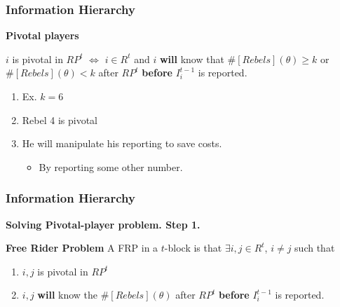 \documentclass[10pt]{beamer}
\begin{document}
\begin{frame}
  \frametitle{Information Hierarchy}

\textbf{Pivotal players}

\begin{definition}
$i$ is pivotal in $RP^t$ $\Leftrightarrow$ $i\in R^t$ and $i$ \textbf{will} know that $\#[Rebels](\theta)\geq k$ or $\#[Rebels](\theta)< k$ after $RP^t$ \textbf{before} $I^{t-1}_i$ is reported.
\end{definition}

\begin{enumerate}
\item Ex. $k=6$
\item Rebel 4 is pivotal
\begin{center}
\end{center}

\item He will manipulate his reporting to save costs.
\begin{itemize}
\item By reporting some other number.
\end{itemize}
\end{enumerate}



\end{frame}


\begin{frame}
  \frametitle{Information Hierarchy}

\textbf{Solving Pivotal-player problem. Step 1.}

\begin{definition}\textbf{Free Rider Problem}
A FRP in a $t$-block is that $\exists i,j\in R^t$, $i\neq j$ such that
\begin{enumerate}
\item $i,j$ is pivotal in $RP^t$
\item $i, j$ \textbf{will} know the $\#[Rebels](\theta)$ after $RP^t$ \textbf{before} $I^{t-1}_i$ is reported.
\end{enumerate}
\end{definition}



\end{frame}
\end{document}
